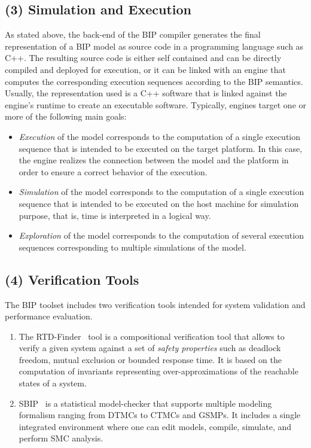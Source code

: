 \subsection*{(3) Simulation and Execution}
As stated above, the back-end of the BIP compiler generates the final representation of 
a BIP model as source code in a programming language such as C++. The resulting source code
is either self contained and can be directly compiled and deployed for execution, or it can 
be linked with an engine that computes the corresponding execution sequences according to 
the BIP semantics. Usually, the representation used is a C++ software 
that is linked against the engine’s runtime to create an executable software. Typically, 
engines target one or more of the following main goals:
\begin{itemize}
  \item \emph{Execution} of the model corresponds to the computation of a single execution 
    sequence that is intended to be executed on the target platform. In this case, the engine 
    realizes the connection between the model and the platform in order to ensure a correct 
    behavior of the execution.
  \item \emph{Simulation} of the model corresponds to the computation of a single execution 
    sequence that is intended to be executed on the host machine for simulation purpose, 
    that is, time is interpreted in a logical way.
  \item \emph{Exploration} of the model corresponds to the computation of several 
    execution sequences corresponding to multiple simulations of the model. 
\end{itemize}
 
\subsection*{(4) Verification Tools}

The BIP toolset includes two verification tools intended for system validation and performance
evaluation.

\begin{enumerate}
  \item The RTD-Finder~\cite{rtdf} tool is a compositional verification tool that allows 
    to verify a given
    system against a set of \emph{safety properties} such as deadlock freedom, mutual exclusion
    or bounded response time. It is based on the computation of invariants representing 
    over-approximations of the reachable states of a system.
  \item SBIP~\cite{sbip} is a statistical model-checker that supports multiple modeling 
    formalism ranging from DTMCs to CTMCs and GSMPs. It includes a single integrated 
    environment where one can edit models, compile, simulate, and perform SMC
    analysis. 
\end{enumerate}


